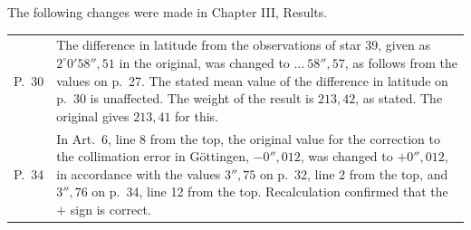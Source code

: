 {The following changes were made in Chapter III, Results.
\par\noindent\begin{tabular}{@{}p{.065\linewidth}p{.91\linewidth}@{}}
P.\ 30&The difference in latitude from the observations of star 39, given as $2^\circ0'58''{,}51$
in the original, was changed to $\ldots\ 58''{,}57$, as follows from the values on p.\ 27.
The stated mean value of the difference in latitude on p.\ 30 is unaffected.
The weight of the result is $213{,}42$, as stated. The original gives $213{,}41$ for this.\\
P.\ 34&In Art.\ 6, line 8 from the top, the original value for the correction to the collimation
error in Göttingen, $-0''{,}012$, was changed to $+0''{,}012$, in accordance with the values $3''{,}75$
on p.\ 32, line 2 from the top, and $3''{,}76$ on p.\ 34, line 12 from the top.
Recalculation confirmed that the $+$ sign is correct.
\end{tabular}\par
}

